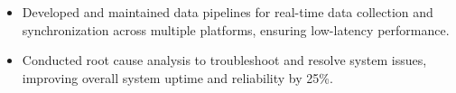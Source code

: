 \par\smallskip
\noindent
\begin{minipage}{20cm}
  \begin{minipage}{9.75cm}
    \begin{itemize}
      \item Developed and maintained data pipelines for real-time data collection and synchronization across multiple platforms, ensuring low-latency performance.
    \end{itemize}
  \end{minipage}
  \hfill
  \begin{minipage}{9.75cm}
    \begin{itemize}
      \item Conducted root cause analysis to troubleshoot and resolve system issues, improving overall system uptime and reliability by 25\%.
    \end{itemize}
  \end{minipage}
\end{minipage}
\par

\divider


